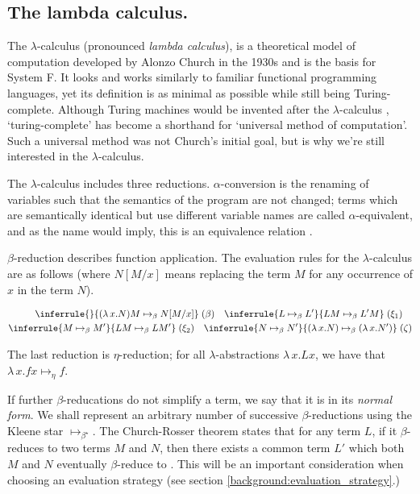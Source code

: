 \subsection{The lambda calculus.}
The $\lambda$-calculus (pronounced \textit{lambda calculus}), is a theoretical model of computation
developed by Alonzo Church in the 1930s \citep{church_set_1932} and is the basis for System F. It
looks and works similarly to familiar functional programming languages, yet its definition is as
minimal as possible while still being Turing-complete. Although Turing machines would be invented
after the $\lambda$-calculus \citep{turing_computable_1937}, `turing-complete' has become a
shorthand for `universal method of computation'. Such a universal method was not Church's initial
goal, but is why we're still interested in the $\lambda$-calculus.

The $\lambda$-calculus includes three reductions. $\alpha$-conversion is the renaming of variables
such that the semantics of the program are not changed; terms which are semantically identical but
use different variable names are called $\alpha$-equivalent, and as the name would imply, this is an
equivalence relation \citep{pierce_types_2002}.

$\beta$-reduction describes function application. The evaluation rules for the $\lambda$-calculus
are as follows \citep{wadler_programming_2022} (where $N[M/x]$ means replacing the term $M$ for any occurrence of $x$ in the term $N$).

\begin{equation}
\label{equation:untyped_beta_rules}
\begin{split}
\inferrule{ }{(\lambda \, x. N)M \mapsto_{\beta} N[M/x]} \; (\beta) \quad
\inferrule{L \mapsto_{\beta} L'}{LM \mapsto_{\beta} L'M} \; (\xi_1) \quad\\
\inferrule{M \mapsto_{\beta} M'}{LM \mapsto_{\beta} LM'} \; (\xi_2) \quad
\inferrule{N \mapsto_{\beta} N'}{(\lambda \, x. N) \mapsto_{\beta} (\lambda \, x. N')} \; (\zeta)
\end{split}
\end{equation}

The last reduction is $\eta$-reduction; for all $\lambda$-abstractions $\lambda \, x. L x$, we have
that $\lambda \, x. f x \mapsto_{\eta} f$.

If further $\beta$-reducations do not simplify a term, we say that it is in its \textit{normal
form}. We shall represent an arbitrary number of successive $\beta$-reductions using the Kleene star
$\mapsto_{\beta^{\star}}$. The Church-Rosser theorem states that for any term $L$, if it
$\beta$-reduces to two terms $M$ and $N$, then there exists a common term $L'$ which both $M$ and
$N$ eventually $\beta$-reduce to \citep{church_properties_1936}. This will be an important
consideration when choosing an evaluation strategy (see section \ref{background:evaluation_strategy}.)

